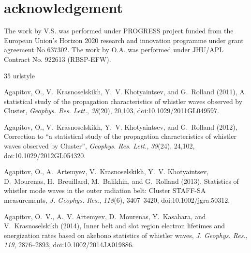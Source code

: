 \documentclass[a4paper]{article}
\renewenvironment{thebibliography}[1]{\begin{oldthebibliography}{#1}\setlength{\parskip}{0ex}\setlength{\itemsep}{0ex}}{\end{oldthebibliography}}
\begin{document}
\section*{\sc acknowledgement}

\indent \indent The work by V.S. was performed under PROGRESS project funded from the European Union's Horizon 2020 research and innovation programme under grant agreement No 637302. The work by O.A. was performed under JHU/APL Contract No. 922613 (RBSP-EFW).

\begin{thebibliography}{35}
\providecommand{\natexlab}[1]{#1}
\expandafter\ifx\csname urlstyle\endcsname\relax
  \providecommand{\doi}[1]{doi:\discretionary{}{}{}#1}\else
  \providecommand{\doi}{doi:\discretionary{}{}{}\begingroup
  \urlstyle{rm}\Url}\fi

Agapitov, O., V.~Krasnoselskikh, Y.~V. Khotyaintsev, and G.~Rolland (2011), A
  statistical study of the propagation characteristics of whistler waves
  observed by {Cluster}, \textit{Geophys. Res. Lett.}, \textit{38}(20), 20,103,
  \doi{10.1029/2011GL049597}.

Agapitov, O., V.~Krasnoselskikh, Y.~V. Khotyaintsev, and G.~Rolland (2012),
  Correction to ``a statistical study of the propagation characteristics of
  whistler waves observed by {Cluster}'', \textit{Geophys. Res. Lett.},
  \textit{39}(24), 24,102, \doi{10.1029/2012GL054320}.

Agapitov, O., A.~Artemyev, V.~Krasnoselskikh, Y.~V. Khotyaintsev, D.~Mourenas,
  H.~Breuillard, M.~Balikhin, and G.~Rolland (2013), Statistics of whistler
  mode waves in the outer radiation belt: {Cluster} {STAFF-SA} measurements,
  \textit{J. Geophys. Res.}, \textit{118}(6), 3407--3420,
  \doi{10.1002/jgra.50312}.

{Agapitov}, O.~V., A.~V. {Artemyev}, D.~{Mourenas}, Y.~{Kasahara}, and
  V.~{Krasnoselskikh} (2014), Inner belt and slot region electron lifetimes and
  energization rates based on akebono statistics of whistler waves, \textit{J.
  Geophys. Res.}, \textit{119}, 2876--2893, \doi{10.1002/2014JA019886}.


\end{thebibliography}
\end{document}
